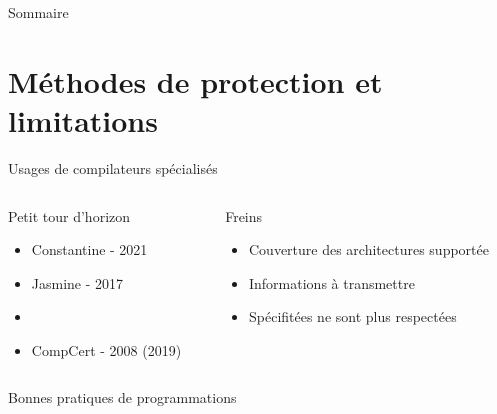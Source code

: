 \documentclass{backend/backend}
\begin{document}
\begin{frame}{Sommaire}

        \small
        \tableofcontents

\end{frame}



\section{Méthodes de protection et limitations}

\begin{frame}{Usages de compilateurs spécialisés}
    \begin{columns}
        \begin{column}{0.5\textwidth}
            \begin{blockSimple}{Petit tour d'horizon}
            \begin{itemize}
                \item Constantine - 2021
                \item Jasmine - 2017
                \item {}
                \item CompCert - 2008 (2019)
            \end{itemize}
        \end{blockSimple}
        \end{column}
        \pause
        \begin{column}{0.5\textwidth}
          \begin{blockSimple}{Freins}
            \pause
                \begin{itemize}
                \item Couverture des architectures supportée
                \item Informations à transmettre
                \item Spécifitées ne sont plus respectées
                \end{itemize}
                
            \end{blockSimple}
        \end{column}
    \end{columns}


\end{frame}

\begin{frame}{Bonnes pratiques de programmations}
    
\end{frame}
\end{document}
